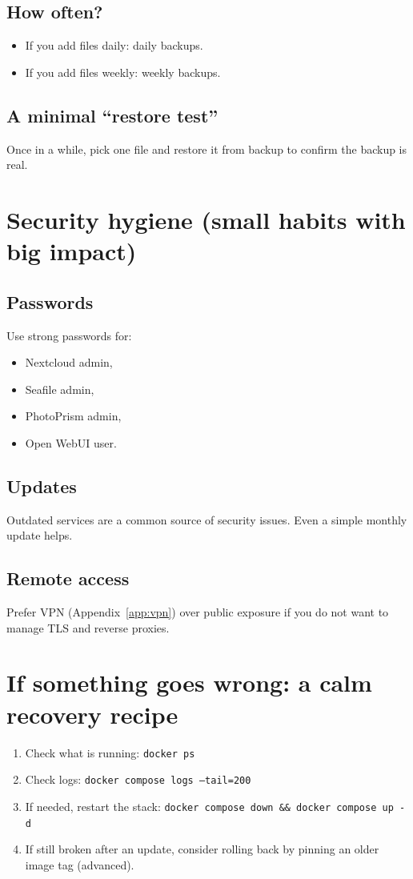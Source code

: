 \subsection{How often?}
\begin{itemize}[leftmargin=*]
  \item If you add files daily: daily backups.
  \item If you add files weekly: weekly backups.
\end{itemize}

\subsection{A minimal ``restore test''}
Once in a while, pick one file and restore it from backup to confirm the backup is real.

\section{Security hygiene (small habits with big impact)}
\subsection{Passwords}
Use strong passwords for:
\begin{itemize}[leftmargin=*]
  \item Nextcloud admin,
  \item Seafile admin,
  \item PhotoPrism admin,
  \item Open WebUI user.
\end{itemize}

\subsection{Updates}
Outdated services are a common source of security issues. Even a simple monthly update helps.

\subsection{Remote access}
Prefer VPN (Appendix~\ref{app:vpn}) over public exposure if you do not want to manage TLS and reverse proxies.

\section{If something goes wrong: a calm recovery recipe}
\begin{enumerate}[leftmargin=*]
  \item Check what is running: \texttt{docker ps}
  \item Check logs: \texttt{docker compose logs --tail=200}
  \item If needed, restart the stack: \texttt{docker compose down \&\& docker compose up -d}
  \item If still broken after an update, consider rolling back by pinning an older image tag (advanced).
\end{enumerate}

